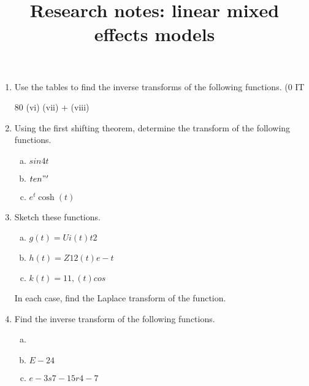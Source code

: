 \documentclass[12pt, a4paper]{report}
\title{Research notes: linear mixed effects models}
\author{ } \date{ }
\theoremstyle{plain}
\theoremstyle{definition}
\theoremstyle{remark}
\begin{document}
\begin{enumerate}

\item 
Use the tables to find the inverse transforms of the following functions. (0 IT 



80 (vi) (vii) + (viii) 

\item

Using the first shifting theorem, determine the transform of the following functions. 
\begin{multicols}{2}
\begin{enumerate}[(a)]
\item  $sin 4t$ 
\item $ten"'$ 
\item $e^t \cosh(t)$ 
\end{enumerate}
\end{multicols}
\item 
Sketch these functions.
\begin{multicols}{2}
\begin{enumerate}[(a)]
\item $g(t) = Ui(t)t2 $
\item $h(t) = Z12(t)e-t $
\item $k(t) = 11,(t) cos $
\end{enumerate}
\end{multicols}

In each case, find the Laplace transform of the function. 
\item 
Find the inverse transform of the following functions. 
\begin{enumerate}[(a)]
\item  
\item $E-24$ 
\item $e -3s 7-15r4-7$ 
\end{enumerate}
\end{enumerate}
\end{document}
